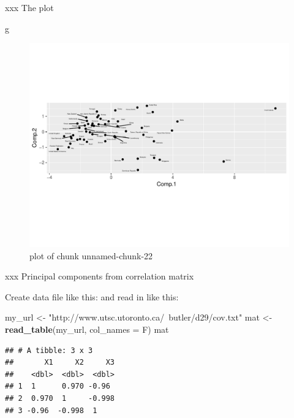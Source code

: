 \documentclass[ignorenonframetext,]{beamer}
\newenvironment{Shaded}{\begin{snugshade}}{\end{snugshade}}
\newcommand{\DataTypeTok}[1]{\textcolor[rgb]{0.13,0.29,0.53}{#1}}
\newcommand{\KeywordTok}[1]{\textcolor[rgb]{0.13,0.29,0.53}{\textbf{#1}}}
\newcommand{\NormalTok}[1]{#1}
\newcommand{\StringTok}[1]{\textcolor[rgb]{0.31,0.60,0.02}{#1}}
\begin{document}
\begin{frame}[fragile]{xxx The plot}
\protect\hypertarget{xxx-the-plot-1}{}

\begin{Shaded}
\begin{Highlighting}[]
\NormalTok{g}
\end{Highlighting}
\end{Shaded}

\begin{figure}
\centering
\includegraphics{figure/unnamed-chunk-22-1.pdf}
\caption{plot of chunk unnamed-chunk-22}
\end{figure}

\end{frame}

\begin{frame}[fragile]{xxx Principal components from correlation matrix}
\protect\hypertarget{xxx-principal-components-from-correlation-matrix}{}

Create data file like this:  and read in like
this:

\begin{Shaded}
\begin{Highlighting}[]
\NormalTok{my_url <-}\StringTok{ "http://www.utsc.utoronto.ca/~butler/d29/cov.txt"}
\NormalTok{mat <-}\StringTok{ }\KeywordTok{read_table}\NormalTok{(my_url, }\DataTypeTok{col_names =}\NormalTok{ F)}
\NormalTok{mat}
\end{Highlighting}
\end{Shaded}

\begin{verbatim}
## # A tibble: 3 x 3
##       X1     X2     X3
##    <dbl>  <dbl>  <dbl>
## 1  1      0.970 -0.96 
## 2  0.970  1     -0.998
## 3 -0.96  -0.998  1
\end{verbatim}

\end{frame}
\end{document}
